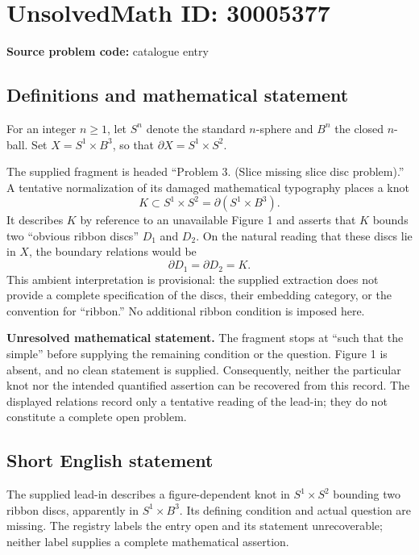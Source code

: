 \documentclass[11pt]{article}
\begin{document}
\section*{UnsolvedMath ID: 30005377}
\textbf{Source problem code:} catalogue entry
\subsection{Definitions and mathematical statement}
For an integer \(n\geq 1\), let \(S^n\) denote the standard \(n\)-sphere and \(B^n\) the closed \(n\)-ball. Set \(X=S^1\times B^3\), so that \(\partial X=S^1\times S^2\).

The supplied fragment is headed ``Problem 3. (Slice missing slice disc problem).'' A tentative normalization of its damaged mathematical typography places a knot
\[
K\subset S^1\times S^2=\partial(S^1\times B^3).
\]
It describes \(K\) by reference to an unavailable Figure 1 and asserts that \(K\) bounds two ``obvious ribbon discs'' \(D_1\) and \(D_2\). On the natural reading that these discs lie in \(X\), the boundary relations would be
\[
\partial D_1=\partial D_2=K.
\]
This ambient interpretation is provisional: the supplied extraction does not provide a complete specification of the discs, their embedding category, or the convention for ``ribbon.'' No additional ribbon condition is imposed here.

\textbf{Unresolved mathematical statement.} The fragment stops at ``such that the simple'' before supplying the remaining condition or the question. Figure 1 is absent, and no clean statement is supplied. Consequently, neither the particular knot nor the intended quantified assertion can be recovered from this record. The displayed relations record only a tentative reading of the lead-in; they do not constitute a complete open problem.
\subsection{Short English statement}
The supplied lead-in describes a figure-dependent knot in \(S^1\times S^2\) bounding two ribbon discs, apparently in \(S^1\times B^3\). Its defining condition and actual question are missing. The registry labels the entry open and its statement unrecoverable; neither label supplies a complete mathematical assertion.
\end{document}
